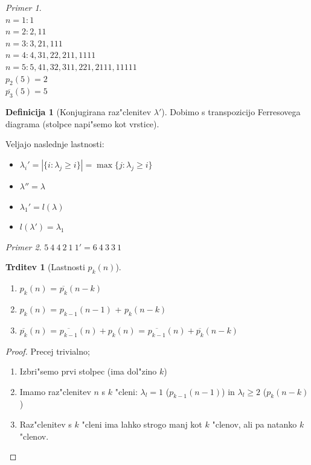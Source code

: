 \documentclass[a4paper,12pt]{article}
\theoremstyle{definition}
\newtheorem{defn}[counter]{Definicija}
\newtheorem{claim}[counter]{Trditev}
\theoremstyle{remark}
\newtheorem*{ex}{Primer}
\begin{document}
\begin{ex}\mbox{}\\
	$n = 1: 1$\\
	$n = 2: 2, 1 1$\\
	$n = 3: 3, 2 1, 1 1 1$\\
	$n = 4: 4, 3 1, 2 2, 2 1 1, 1 1 1 1$\\
	$n = 5: 5, 4 1, 3 2, 3 1 1, 2 2 1, 2 1 1 1, 1 1 1 1 1$\\
	$p_2(5) = 2$\\
	$\overline{p_3}(5) = 5$
\end{ex}

\begin{defn} [Konjugirana raz"clenitev $\lambda '$]
	Dobimo s transpozicijo Ferresovega diagrama (stolpce napi"semo kot vrstice).
\end{defn}
Veljajo naslednje lastnosti:
\begin{itemize}
	\item $\lambda_i ' = |\{i: \lambda_j \geqslant i\}| = \max\{j: \lambda_j \geqslant i\}$
	\item $\lambda '' = \lambda$
	\item $\lambda_1 ' = l(\lambda)$
	\item $l(\lambda ') = \lambda_1$
\end{itemize}
\begin{ex}
	$5 \ 4 \ 4 \ 2 \ 1 \ 1 ' = 6 \ 4 \ 3 \ 3 \ 1$
\end{ex}

\begin{claim}[Lastnosti $p_k(n)$]\mbox{}
	\begin{enumerate}
	    \item $p_k(n)$ = $\overline{p_{k}} (n - k)$
	    \item $p_k(n)$ = $p_{k - 1} (n - 1)$ + $p_k (n - k)$
	    \item $\overline{p_{k}}(n)$ = $\overline{p_{k - 1}}(n) + p_k (n)$ = $\overline{p_{k - 1}}(n) + \overline{p_k} (n - k)$
	\end{enumerate}
\end{claim}

\begin{proof}
	Precej trivialno;
    \begin{enumerate}
        \item Izbri"semo prvi stolpec (ima dol"zino $k$)
        \item Imamo raz"clenitev $n$ s $k$ "cleni: $\lambda_l = 1$ ($p_{k - 1}(n - 1)$) in $\lambda_l \geqslant 2$ ($p_k(n - k)$)
        \item Raz"clenitev s $k$ "cleni ima lahko strogo manj kot $k$ "clenov, ali pa natanko $k$ "clenov.
    \end{enumerate}
\end{proof}
\end{document}
